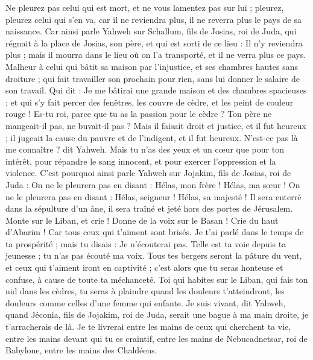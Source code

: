 \begin{multicols}{2}
Ne pleurez pas celui qui est mort, et ne vous lamentez pas sur lui ; pleurez, pleurez celui qui s'en va, car il ne reviendra plus, il ne reverra plus le pays de sa naissance.
Car ainsi parle Yahweh sur Schallum, fils de Josias, roi de Juda, qui régnait à la place de Josias, son père, et qui est sorti de ce lieu : Il n'y reviendra plus ;
mais il mourra dans le lieu où on l'a transporté, et il ne verra plus ce pays.
Malheur à celui qui bâtit sa maison par l'injustice, et ses chambres hautes sans droiture ; qui fait travailler son prochain pour rien, sans lui donner le salaire de son travail.
Qui dit : Je me bâtirai une grande maison et des chambres spacieuses ; et qui s'y fait percer des fenêtres, les couvre de cèdre, et les peint de couleur rouge !
Es-tu roi, parce que tu as la passion pour le cèdre ? Ton père ne mangeait-il pas, ne buvait-il pas ? Mais il faisait droit et justice, et il fut heureux ;
il jugeait la cause du pauvre et de l'indigent, et il fut heureux. N'est-ce pas là me connaître ? dit Yahweh.
Mais tu n'as des yeux et un cœur que pour ton intérêt, pour répandre le sang innocent, et pour exercer l'oppression et la violence.
C'est pourquoi ainsi parle Yahweh sur Jojakim, fils de Josias, roi de Juda : On ne le pleurera pas en disant : Hélas, mon frère ! Hélas, ma sœur ! On ne le pleurera pas en disant : Hélas, seigneur ! Hélas, sa majesté !
Il sera enterré dans la sépulture d'un âne, il sera traîné et jeté hors des portes de Jérusalem.
Monte sur le Liban, et crie ! Donne de la voix sur le Basan ! Crie du haut d'Abarim ! Car tous ceux qui t'aiment sont brisés.
Je t'ai parlé dans le temps de ta prospérité ; mais tu disais : Je n'écouterai pas. Telle est ta voie depuis ta jeunesse ; tu n'as pas écouté ma voix.
Tous tes bergers seront la pâture du vent, et ceux qui t'aiment iront en captivité ; c'est alors que tu seras honteuse et confuse, à cause de toute ta méchanceté.
Toi qui habites sur le Liban, qui fais ton nid dans les cèdres, tu seras à plaindre quand les douleurs t'atteindront, les douleurs comme celles d'une femme qui enfante.
Je suis vivant, dit Yahweh, quand Jéconia, fils de Jojakim, roi de Juda, serait une bague à ma main droite, je t'arracherais de là.
Je te livrerai entre les mains de ceux qui cherchent ta vie, entre les mains devant qui tu es craintif, entre les mains de Nebucadnetsar, roi de Babylone, entre les mains des Chaldéens.

\end{multicols}

